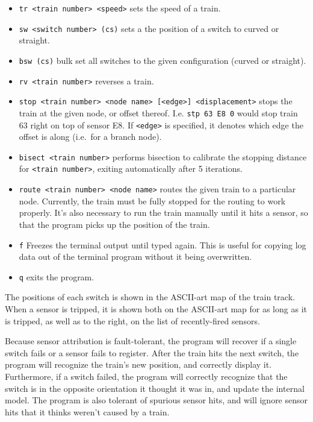 \begin{itemize}
\itemsep1pt\parskip0pt
\item
  \texttt{tr \textless{}train number\textgreater{} \textless{}speed\textgreater{}}
  sets the speed of a train.
\item
  \texttt{sw \textless{}switch number\textgreater{} (c\textbar{}s)} sets
  a the position of a switch to curved or straight.
\item
  \texttt{bsw (c\textbar{}s)} bulk set all switches to the given
  configuration (curved or straight).
\item
  \texttt{rv \textless{}train number\textgreater{}} reverses a train.
\item
  \texttt{stop \textless{}train number\textgreater{} \textless{}node name\textgreater{} {[}\textless{}edge\textgreater{}{]} \textless{}displacement\textgreater{}}
  stops the train at the given node, or offset thereof. I.e.
  \texttt{stp 63 E8 0} would stop train 63 right on top of sensor E8. If
  \texttt{\textless{}edge\textgreater{}} is specified, it denotes which
  edge the offset is along (i.e.~for a branch node).
\item
  \texttt{bisect \textless{}train number\textgreater{}} performs
  bisection to calibrate the stopping distance for
  \texttt{\textless{}train number\textgreater{}}, exiting automatically
  after 5 iterations.
\item
  \texttt{route \textless{}train number\textgreater{} \textless{}node name\textgreater{}}
  routes the given train to a particular node. Currently, the train must
  be fully stopped for the routing to work properly. It's also necessary
  to run the train manually until it hits a sensor, so that the program
  picks up the position of the train.
\item
  \texttt{f} Freezes the terminal output until typed again. This is
  useful for copying log data out of the terminal program without it
  being overwritten.
\item
  \texttt{q} exits the program.
\end{itemize}

The positions of each switch is shown in the ASCII-art map of the train
track. When a sensor is tripped, it is shown both on the ASCII-art map
for as long as it is tripped, as well as to the right, on the list of
recently-fired sensors.

Because sensor attribution is fault-tolerant, the program will recover
if a single switch fails or a sensor fails to register. After the train
hits the next switch, the program will recognize the train's new
position, and correctly display it. Furthermore, if a switch failed, the
program will correctly recognize that the switch is in the opposite
orientation it thought it was in, and update the internal model. The
program is also tolerant of spurious sensor hits, and will ignore sensor
hits that it thinks weren't caused by a train.
